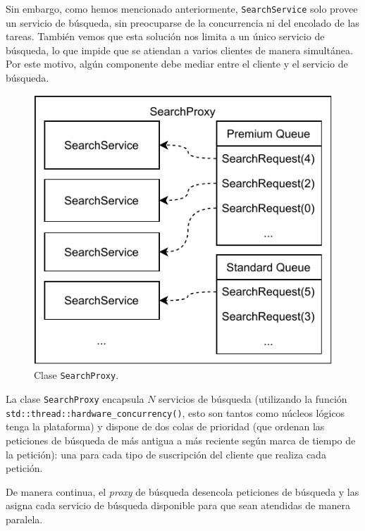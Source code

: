 \documentclass[a4paper]{article}
\begin{document}
	Sin embargo, como hemos mencionado anteriormente, \texttt{SearchService} solo provee un servicio de búsqueda, sin preocuparse de la concurrencia ni del encolado de las tareas. También vemos que esta solución nos limita a un único servicio de búsqueda, lo que impide que se atiendan a varios clientes de manera simultánea. Por este motivo, algún componente debe mediar entre el cliente y el servicio de búsqueda.
	
	\begin{figure}[h]
		\centering
		\includegraphics[scale=0.8]{figures/search_proxy.pdf}
		\caption{Clase \texttt{SearchProxy}.}
	\end{figure}
	
	La clase \texttt{SearchProxy} encapsula $N$ servicios de búsqueda (utilizando la función \texttt{std::thread::hardware\_concurrency()}, esto son tantos como núcleos lógicos tenga la plataforma) y dispone de dos colas de prioridad (que ordenan las peticiones de búsqueda de más antigua a más reciente según marca de tiempo de la petición): una para cada tipo de suscripción del cliente que realiza cada petición.
	
	De manera continua, el \textit{proxy} de búsqueda desencola peticiones de búsqueda y las asigna cada servicio de búsqueda disponible para que sean atendidas de manera paralela.
	
\end{document}
